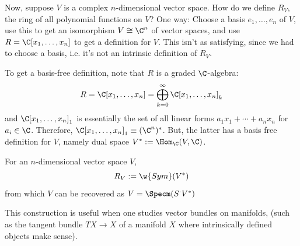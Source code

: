 Now, suppose $V$ is a complex $n$-dimensional vector space. How do we define $R_V$, the ring of all polynomial functions on $V$? One way: Choose a basis $e_1,\dots ,e_n$ of $V$, use this to get an isomorphism $V \cong \C^n$ of vector spaces, and use $R = \C[x_1,\dots,x_n]$ to get a definition for $V$. This isn't as satisfying, since we had to choose a basis, i.e. it's not an intrinsic definition of $R_V$.

To get a basis-free definition, note that $R$ is a graded $\C$-algebra:
$$R = \C[ x_1,\dots,x_n] = \bigoplus_{k=0}^\infty \C[x_1,\dots,x_n]_k$$
and $\C[x_1,\dots,x_n]_1$ is essentially the set of all linear forms $a_1x_1+\cdots + a_nx_n$ for $a_i \in \C$. Therefore, $\C[x_1,\dots,x_n]_1 \equiv (\C^n)^*$. But, the latter has a basis free definition for $V$, namely dual space $V^* := \Hom _\C (V,\C)$.

\begin{defn}
    For an $n$-dimensional vector space $V$,
    $$R_V := \w{Sym} (V^*)$$
    from which $V$ can be recovered as $V = \Specm (S^\cdot V^*)$
\end{defn}

This construction is useful when one studies vector bundles on manifolds, (such as the tangent bundle $TX \to X$ of a manifold $X$ where intrinsically defined objects make sense).

